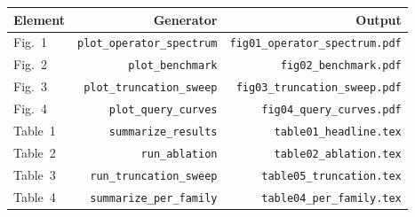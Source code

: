 \begin{tabular}{lrr}
\toprule
Element & Generator & Output \\
\midrule
Fig.~1 & \texttt{plot\_operator\_spectrum} & \texttt{fig01\_operator\_spectrum.pdf} \\
Fig.~2 & \texttt{plot\_benchmark} & \texttt{fig02\_benchmark.pdf} \\
Fig.~3 & \texttt{plot\_truncation\_sweep} & \texttt{fig03\_truncation\_sweep.pdf} \\
Fig.~4 & \texttt{plot\_query\_curves} & \texttt{fig04\_query\_curves.pdf} \\
Table~1 & \texttt{summarize\_results} & \texttt{table01\_headline.tex} \\
Table~2 & \texttt{run\_ablation} & \texttt{table02\_ablation.tex} \\
Table~3 & \texttt{run\_truncation\_sweep} & \texttt{table05\_truncation.tex} \\
Table~4 & \texttt{summarize\_per\_family} & \texttt{table04\_per\_family.tex} \\
\bottomrule
\end{tabular}
